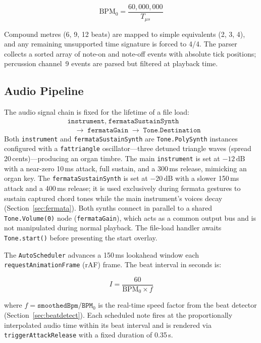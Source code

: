 \documentclass[conference]{IEEEtran}
\begin{document}
\begin{equation}
  \text{BPM}_0 = \frac{60{,}000{,}000}{T_{\mu s}}
  \label{eq:bpm}
\end{equation}

Compound metres (6, 9, 12 beats) are mapped to simple equivalents
(2, 3, 4), and any remaining unsupported time signature is forced to
4/4. The parser collects a sorted array of note-on and note-off events
with absolute tick positions; percussion channel~9 events are parsed
but filtered at playback time.

\subsection{Audio Pipeline}

The audio signal chain is fixed for the lifetime of a file load:
\begin{align*}
  &\texttt{instrument},\;\texttt{fermataSustainSynth}\\
  &\quad\longrightarrow\;\texttt{fermataGain}
     \;\longrightarrow\;\texttt{Tone.Destination}
\end{align*}
Both \texttt{instrument} and \texttt{fermataSustainSynth} are
\texttt{Tone.PolySynth} instances configured with a
\texttt{fattriangle} oscillator---three detuned triangle waves (spread
20\,cents)---producing an organ timbre. The main \texttt{instrument} is
set at $-12\,\text{dB}$ with a near-zero 10\,ms attack, full sustain,
and a 300\,ms release, mimicking an organ key. The
\texttt{fermataSustainSynth} is set at $-20\,\text{dB}$ with a slower
150\,ms attack and a 400\,ms release; it is used exclusively during
fermata gestures to sustain captured chord tones while the main
instrument's voices decay (Section~\ref{sec:fermata}). Both synths
connect in parallel to a shared \texttt{Tone.Volume(0)} node
(\texttt{fermataGain}), which acts as a common output bus and is not
manipulated during normal playback. The file-load handler awaits
\texttt{Tone.start()} before presenting the start overlay.

The \texttt{AutoScheduler} advances a 150\,ms lookahead window each
\texttt{requestAnimationFrame} (rAF) frame. The beat interval in
seconds is:

\begin{equation}
  I = \frac{60}{\text{BPM}_0 \times f}
  \label{eq:interval}
\end{equation}

\noindent where $f = \texttt{smoothedBpm} / \texttt{BPM}_0$ is the
real-time speed factor from the beat detector
(Section~\ref{sec:beatdetect}). Each scheduled note fires at the
proportionally interpolated audio time within its beat interval and is
rendered via \texttt{triggerAttackRelease} with a fixed duration of
0.35\,s.
\end{document}
